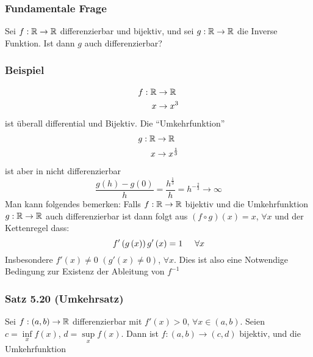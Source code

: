 \subsubsection*{Fundamentale Frage}
Sei $f:\mathbb{R}\to\mathbb{R}$ differenzierbar und bijektiv, und sei $g:\mathbb{R}\to\mathbb{R}$ die Inverse Funktion. Ist dann $g$ auch differenzierbar?

\subsubsection*{Beispiel}
\begin{align*}
f:\mathbb{R}&\to\mathbb{R}\\
x&\to x^3
\end{align*}
ist überall differential und Bijektiv. Die ``Umkehrfunktion''
\begin{align*}
g:\mathbb{R}&\to\mathbb{R}\\
x&\to x^{1\over 3}
\end{align*}
ist aber in  nicht differenzierbar 
\[\frac{{g\left( h \right) - g\left( 0 \right)}}{h} = \frac{{{h^{\frac{1}{3}}}}}{h} = {h^{ - \frac{2}{3}}} \to \infty \]
Man kann folgendes bemerken: Falls $f:\mathbb{R}\to\mathbb{R}$ bijektiv und die Umkehrfunktion $g:\mathbb{R}\to\mathbb{R}$ auch differenzierbar ist dann folgt aus $\left( f\circ g\right)(x)=x$, $\forall x$ und der Kettenregel dass:
\[f'\left( {g\left( x \right)} \right)g'\left( x \right) = 1\hspace{5mm}\forall x\]
Insbesondere $f'(x)\not=0$ $\left(g'(x)\not=0\right)$, $\forall x$. Dies ist also eine Notwendige Bedingung zur Existenz  der Ableitung von $f^{-1}$

\subsubsection*{Satz 5.20 (Umkehrsatz)}
Sei $f:\left( a,b\right)\to\mathbb{R}$ differenzierbar mit $f'(x)>0$, $\forall x\in\left( a,b\right)$. Seien $c = \mathop {\inf }\limits_x f\left( x \right)$, $d = \mathop {\sup }\limits_x f\left( x \right)$. Dann ist $f:\left( a,b\right)\to\left( c,d\right)$ bijektiv, und die Umkehrfunktion 
